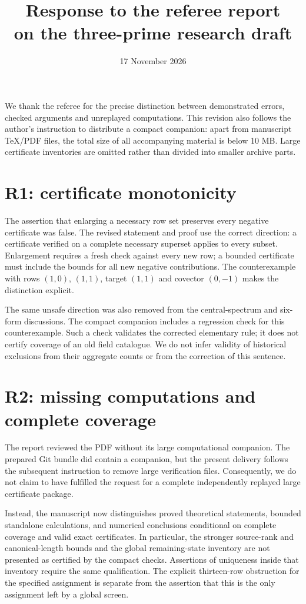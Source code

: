 \documentclass[11pt,a4paper]{article}
\title{Response to the referee report\\on the three-prime research draft}
\author{}
\date{17 November 2026}
\begin{document}
\maketitle
We thank the referee for the precise distinction between demonstrated errors,
checked arguments and unreplayed computations. This revision also follows the
author's instruction to distribute a compact companion: apart from manuscript
TeX/PDF files, the total size of all accompanying material is below 10 MB. Large certificate inventories are
omitted rather than divided into smaller archive parts.

\section*{R1: certificate monotonicity}
The assertion that enlarging a necessary row set preserves every negative
certificate was false. The revised statement and proof use the correct
direction: a certificate verified on a complete necessary superset applies
to every subset. Enlargement requires a fresh check against every new row;
a bounded certificate must include the bounds for all new negative
contributions. The counterexample with rows $(1,0)$, $(1,1)$, target $(1,1)$
and covector $(0,-1)$ makes the distinction explicit.

The same unsafe direction was also removed from the central-spectrum
and six-form discussions. The compact companion includes a regression check
for this counterexample.
Such a check validates the corrected elementary rule; it does not certify
coverage of an old field catalogue. We do not infer validity of historical
exclusions from their aggregate counts or from the correction of this sentence.

\section*{R2: missing computations and complete coverage}
The report reviewed the PDF without its large computational companion. The
prepared Git bundle did contain a companion, but the present delivery follows
the subsequent instruction to remove large verification files. Consequently,
we do not claim to have fulfilled the request for a complete independently
replayed large certificate package.

Instead, the manuscript now distinguishes proved theoretical statements,
bounded standalone calculations, and numerical conclusions conditional on
complete coverage and valid exact certificates. In particular, the stronger
source-rank and canonical-length bounds and the global remaining-state
inventory are not presented as certified by the compact checks. Assertions
of uniqueness inside that inventory require the same qualification. The
explicit thirteen-row obstruction for the specified assignment is separate
from the assertion that this is the only assignment left by a global screen.
\end{document}
